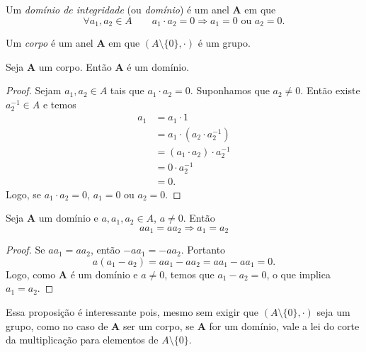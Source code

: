 \begin{defi}
	Um \emph{domínio de integridade} (ou \emph{domínio}) é um anel $\bm A$ em que
	\begin{equation*}
	\forall a_1, a_2 \in A \qquad a_1 \cdot a_2 = 0 \Rightarrow a_1=0 \text{\ \ ou\ \ } a_2=0.
	\end{equation*}
\end{defi}

\begin{defi}
	Um \emph{corpo} é um anel $\bm A$ em que $(A \setminus \{0\},\cdot)$ é um grupo.
\end{defi}

\begin{prop}
\label{prop:corp.dom}
	Seja $\bm A$ um corpo. Então $\bm A$ é um domínio.
\end{prop}
\begin{proof}
	Sejam $a_1,a_2 \in A$ tais que $a_1 \cdot a_2=0$. Suponhamos que $a_2 \neq 0$. Então existe $a_2^{-1} \in A$ e temos
	\begin{equation*}
	\begin{split}
	a_1 &= a_1 \cdot 1 \\
		&= a_1 \cdot (a_2 \cdot a_2^{-1}) \\
		&= (a_1 \cdot a_2) \cdot a_2^{-1}\\
		&= 0 \cdot a_2^{-1} \\
		&= 0.
	\end{split}
	\end{equation*}
	Logo, se $a_1 \cdot a_2=0$, $a_1=0$ ou $a_2=0$.
\end{proof}

\begin{prop}
	Seja $\bm A$ um domínio e $a,a_1,a_2 \in A$, $a \neq 0$. Então
	\begin{equation*}
	aa_1 = aa_2 \Rightarrow a_1=a_2
	\end{equation*}
\end{prop}
\begin{proof}
	Se $aa_1 = aa_2$, então $-aa_1 = -aa_2$. Portanto
	\begin{equation*}
	a(a_1-a_2) = aa_1 -aa_2 = aa_1 -aa_1 = 0.
	\end{equation*}
Logo, como $\textbf{A}$ é um domínio e $a \neq 0$, temos que $a_1-a_2=0$, o que implica $a_1=a_2$.
\end{proof}

	Essa proposição é interessante pois, mesmo sem exigir que $(A \setminus \{0\},\cdot)$ seja um grupo, como no caso de $\textbf{A}$ ser um corpo, se $\textbf{A}$ for um domínio, vale a lei do corte da multiplicação para elementos de $A \setminus \{0\}$.

